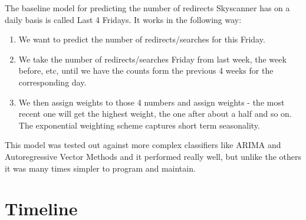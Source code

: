 \documentclass[minf,frontabs,twoside,singlespacing,parskip]{infthesis}
\begin{document}
The baseline model for predicting the number of redirects Skyscanner has on a daily basis is called Last 4 Fridays. 
It works in the following way:
\begin{enumerate}
\item We want to predict the number of redirects/searches for this Friday.
\item We take the number of redirects/searches Friday from last week, the week before, etc, until we have the counts form the previous 4 weeks for the corresponding day.
\item We then assign weights to those 4 numbers and assign weights - the most recent one will get the highest weight, the one after about a half and so on. The exponential weighting scheme captures short term seasonality.
\end{enumerate}

This model was tested out against more complex classifiers like ARIMA and Autoregressive Vector Methods and it performed really well, but unlike the others it was many times simpler to program and maintain.



\chapter{Timeline}




\end{document}
